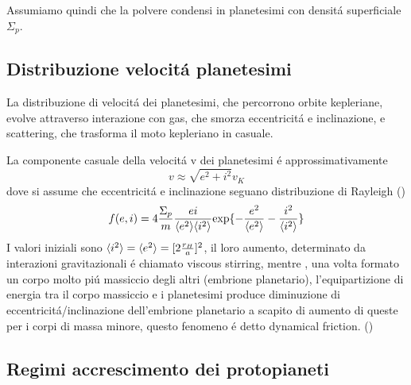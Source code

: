 Assumiamo quindi che la polvere condensi in planetesimi con densit\'a superficiale $\Sigma_p$.
\subsection{Distribuzione velocit\'a planetesimi}
La distribuzione di velocit\'a dei planetesimi, che percorrono orbite kepleriane, evolve attraverso interazione con gas, che smorza eccentricit\'a e inclinazione, e scattering, che trasforma il moto kepleriano in casuale.


La componente casuale della velocit\'a v dei planetesimi \'e approssimativamente
\begin{equation}
v\approx\sqrt{e^2+i^2}v_K
\end{equation}
dove si assume che eccentricit\'a e inclinazione seguano distribuzione di Rayleigh (\cite{ida1992n})
\begin{equation}
f(e,i)=4\frac{\Sigma_p}{m}\frac{ei}{\langle e^2 \rangle\langle i^2 \rangle}\text{exp}\{-\frac{e^2}{\langle e^2 \rangle}-\frac{i^2}{\langle i^2 \rangle}\}
\end{equation}
I valori iniziali sono $\langle i^2 \rangle=\langle e^2 \rangle=[2\frac{r_H}{a}]^2$, il loro aumento, determinato da interazioni gravitazionali \'e chiamato viscous stirring, mentre , una volta formato un corpo molto pi\'u massiccio degli altri (embrione planetario), l'equipartizione di energia tra il corpo massiccio e i planetesimi produce diminuzione di eccentricit\'a/inclinazione dell'embrione planetario a scapito di aumento di queste per i corpi di massa minore, questo fenomeno \'e detto dynamical friction. (\cite{kokubo2012dynamics})
 
\subsection{Regimi accrescimento dei protopianeti}


